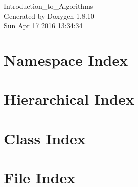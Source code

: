 \documentclass[twoside]{book}
\newcommand{\+}{\discretionary{\mbox{\scriptsize$\hookleftarrow$}}{}{}}
\newcommand{\clearemptydoublepage}{%
  \newpage{\pagestyle{empty}\cleardoublepage}%
}
\begin{document}
\hypersetup{pageanchor=false,
             bookmarks=true,
             bookmarksnumbered=true,
             pdfencoding=unicode
            }
\begin{titlepage}
\vspace*{7cm}
\begin{center}%
{\Large Introduction\+\_\+to\+\_\+\+Algorithms }\\
\vspace*{1cm}
{\large Generated by Doxygen 1.8.10}\\
\vspace*{0.5cm}
{\small Sun Apr 17 2016 13:34:34}\\
\end{center}
\end{titlepage}
\clearemptydoublepage
\tableofcontents
\clearemptydoublepage
{}
\hypersetup{pageanchor=true}

\chapter{Namespace Index}

\chapter{Hierarchical Index}

\chapter{Class Index}

\chapter{File Index}

\end{document}

